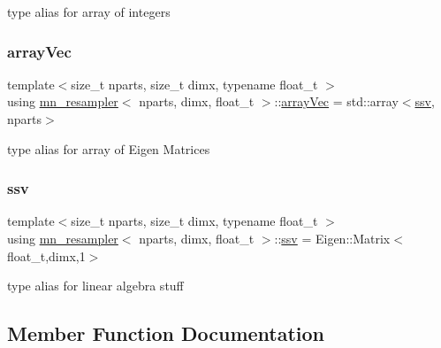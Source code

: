 type alias for array of integers \mbox{\label{classmn__resampler_aa8ff37576399807b14a7a12615032bb1}} 
\subsubsection{\texorpdfstring{array\+Vec}{arrayVec}}
{\footnotesize\ttfamily template$<$size\+\_\+t nparts, size\+\_\+t dimx, typename float\+\_\+t $>$ \\
using \hyperlink{classmn__resampler}{mn\+\_\+resampler}$<$ nparts, dimx, float\+\_\+t $>$\+::\hyperlink{classrbase_aa12fc826befa6ba0647b5f59ebc396ee}{array\+Vec} =  std\+::array$<$\hyperlink{classrbase_ae20e0b8df15aa109252f57ecbf1f20f8}{ssv}, nparts$>$}

type alias for array of Eigen Matrices \mbox{\label{classmn__resampler_a1cb075b42f73e01de7fc1b27f51bfc4c}} 
\subsubsection{\texorpdfstring{ssv}{ssv}}
{\footnotesize\ttfamily template$<$size\+\_\+t nparts, size\+\_\+t dimx, typename float\+\_\+t $>$ \\
using \hyperlink{classmn__resampler}{mn\+\_\+resampler}$<$ nparts, dimx, float\+\_\+t $>$\+::\hyperlink{classrbase_ae20e0b8df15aa109252f57ecbf1f20f8}{ssv} =  Eigen\+::\+Matrix$<$float\+\_\+t,dimx,1$>$}

type alias for linear algebra stuff 

\subsection{Member Function Documentation}
\mbox{\label{classmn__resampler_a13b1897e180a791a3a099d5d6329a125}} 
